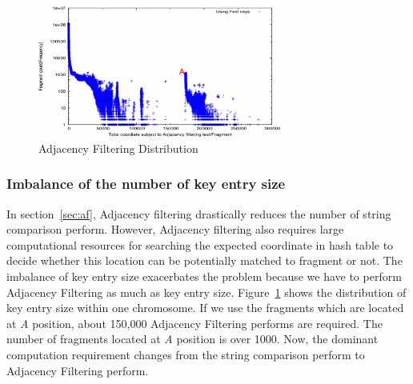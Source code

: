 \begin{figure}[t] \centering \vspace{0.1in}
\includegraphics[height=1.7in]{./figure/Key_Dist_B.pdf} \vspace{0in}
\caption{Adjacency Filtering Distribution} 
\label{fig:key_dist} 
\end{figure}

\subsubsection{Imbalance of the number of key entry size} 

In section~\ref{sec:af}, Adjacency filtering drastically reduces the number of
string comparison perform. However, Adjacency filtering also requires large
computational resources for searching the expected coordinate in hash table to
decide whether this location can be potentially matched to fragment or not. The
imbalance of key entry size exacerbates the problem because we have to perform
Adjacency Filtering as much as key entry size. Figure~\ref{fig:key_dist} shows
the distribution of key entry size within one chromosome. If we use the
fragments which are located at \textit{A} position, about 150,000 Adjacency
Filtering performs are required. The number of fragments located at \textit{A}
position is over 1000. Now, the dominant computation requirement changes from
the string comparison perform to Adjacency Filtering perform.

